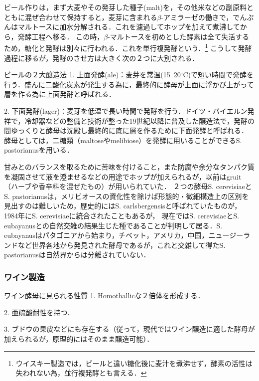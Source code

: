 \documentclass[uplatex, dvipdfmx]{jsarticle}
\begin{document}
ビール作りは，まず大麦やその発芽した種子(malt)を，その他米などの副原料とともに混ぜ合わせて保持すると，麦芽に含まれる$\beta$-アミラーゼの働きで，でんぷんはマルトースに加水分解される．これを濾過してホップを加えて煮沸してから，発酵工程へ移る．
この時，$\beta$-マルトースを初めとした酵素は全て失活するため，糖化と発酵は別々に行われる．これを単行複発酵という．\footnote{ウイスキー製造では，ビールと違い糖化後に麦汁を煮沸せず，酵素の活性は失われない為，並行複発酵とも言える．\cite{酵母}}
こうして発酵過程に移るが，発酵のさせ方は大きく次の２つに大別される．
\begin{itembox}[l]{ビールの２大醸造法}
    1. 上面発酵(ale)：麦芽を常温(15~20$^\circ\mathrm{C}$)で短い時間で発酵を行う．盛んに二酸化炭素が発生する為に，最終的に酵母が上面に浮かび上がって層を作る為に上面発酵と呼ばれる．

    2. 下面発酵(lager)：麦芽を低温で長い時間で発酵を行う．ドイツ・バイエルン発祥で，冷却器などの整備と技術が整った19世紀以降に普及した醸造法で，発酵の間ゆっくりと酵母は沈殿し最終的に底に層を作るために下面発酵と呼ばれる．
    酵母としては，二糖類（maltoseやmelibiose）を発酵に用いることができるS. pastorianusを用いる．
\end{itembox}
甘みとのバランスを取るために苦味を付けること，また防腐や余分なタンパク質を凝固させて液を澄ませるなどの用途でホップが加えられるが，以前はgruit（ハーブや香辛料を混ぜたもの）が用いられていた．
２つの酵母S. cerevisiaeとS. pastorianusは，メリビオースの資化性を除けば形態的・微細構造上の区別を見出すのは難しいため，歴史的にはS. carlsbergensisと呼ばれていたものが，1984年にS. cerevisiaeに統合されたこともあるが\cite{有村}，
現在ではS. cerevisiaeとS. eubayanusとの自然交雑の結果生じた種であることが判明して居る\cite{pastorianus}．S. eubayanusはパタゴニアから始まり，チベット，アメリカ，中国，ニュージーランドなど世界各地から発見された酵母であるが，これと交雑して得たS. pastorianusは自然界からは分離されていない．

\subsubsection{ワイン製造}

\begin{itembox}[l]{ワイン酵母に見られる性質}
    1. Homothallicな２倍体を形成する．

    2. 亜硫酸耐性を持つ．

    3. ブドウの果皮などにも存在する（従って，現代ではワイン醸造に適した酵母が加えられるが，原理的にはそのまま醸造可能）．
\end{itembox}
\end{document}
